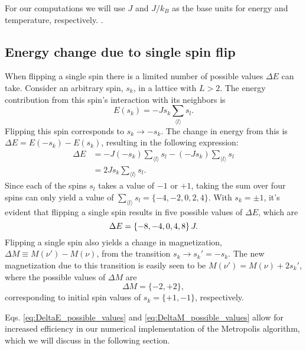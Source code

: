 For our computations we will use $J$ and $J/k_B$ as the base units for energy and temperature, respectively. . 

\subsection{Energy change due to single spin flip}\label{subsec_implementations:de_from_single_flip}
When flipping a single spin there is a limited number of possible values $\Delta E$ can take. Consider an arbitrary spin, $s_k$, in a lattice with $L>2$. The energy contribution from this spin's interaction with its neighbors is 
\begin{equation}\label{eq:single_spin_energy}
    E(s_k) = -J s_k \sum_{\langle l \rangle} s_l.
\end{equation}   
Flipping this spin corresponds to $s_k\to -s_k$. The change in energy from this is $\Delta E=E(-s_k)-E(s_k)$, resulting in the following expression:
\begin{align}
        \Delta E &= -J(-s_k) \sum_{\langle l \rangle} s_l - (-J s_k) \sum_{\langle l \rangle} s_l \nonumber \\ 
        &= 2Js_k \sum_{\langle l \rangle} s_l. \label{eq:DeltaE_from_single_spin_flip}
\end{align}
Since each of the spins $s_l$ takes a value of $-1$ or $+1$, taking the sum over four spins can only yield a value of $\sum_{\langle l \rangle}s_l=\{-4,-2,0,2,4\}$. With $s_k=\pm1$, it's evident that flipping a single spin results in five possible values of $\Delta E$, which are 
\begin{equation}\label{eq:DeltaE_possible_values}
    \Delta E = \{-8,-4,0,4,8\}\,J. 
\end{equation}  
Flipping a single spin also yields a change in magnetization, $\Delta M\equiv M(\nu')-M(\nu)$, from the transition $s_k\to s_k'=-s_k$. The new magnetization due to this transition is easily seen to be $M(\nu') = M(\nu) + 2 s_k'$, where the possible values of $\Delta M$ are  
\begin{equation} \label{eq:DeltaM_possible_values}
    \Delta M=\{-2,+2\},
\end{equation} 
corresponding to initial spin values of $s_k=\{+1,-1\}$, respectively.   

Eqs. \eqref{eq:DeltaE_possible_values} and \eqref{eq:DeltaM_possible_values} allow for increased efficiency in our numerical implementation of the Metropolis algorithm, which we will discuss in the following section.  


